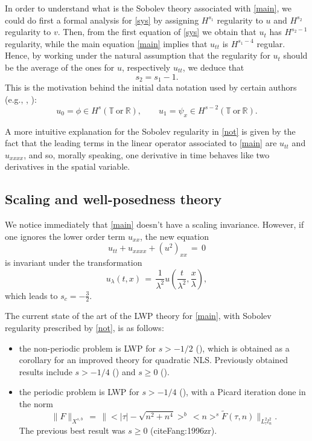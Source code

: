 \documentclass{amsart}
\begin{document}
In order to understand what is the Sobolev theory associated with \eqref{main}, we could do first a formal analysis for \eqref{sys} by assigning $H^{s_1}$ regularity to $u$ and $H^{s_2}$ regularity to $v$. Then, from the first equation of \eqref{sys} we obtain that $u_t$ has $H^{s_2-1}$ regularity, while the main equation \eqref{main} implies that $u_{tt}$ is $H^{s_1-4}$ regular. Hence, by working under the natural assumption that the regularity for $u_t$ should be the average of the ones for $u$, respectively $u_{tt}$, we deduce that
\[
s_2=s_1-1.
\] 
This is the motivation behind the initial data notation used by certain authors (e.g., \cite{Farah:2009uq}, \cite{Farah:2010ys}):
\begin{equation}
u_0=\phi\in H^s(\mathbb{T}\ \text{or} \ \mathbb{R}), \qquad u_1=\psi_x \in H^{s-2}(\mathbb{T}\ \text{or} \ \mathbb{R}).
\label{not}
\end{equation}

A more intuitive explanation for the Sobolev regularity in \eqref{not} is given by the fact that the leading terms in the linear operator associated to \eqref{main} are $u_{tt}$ and $u_{xxxx}$, and so, morally speaking, one derivative in time behaves like two derivatives in the spatial variable. 

\subsection{Scaling and well-posedness theory} We notice immediately that \eqref{main} doesn't have a scaling invariance. However, if one ignores the lower order term $u_{xx}$, the new equation 
\begin{equation}
u_{tt}+u_{xxxx}+(u^2)_{xx}\,=\,0\label{new}
\end{equation}
is invariant under the transformation
\[
u_{\lambda}(t,x)\,=\,\frac{1}{\lambda^2}u\left(\frac{t}{\lambda^2}, \frac{x}{\lambda}\right),
\]
which leads to $s_c=-\frac 32$.

The current state of the art of the LWP theory for \eqref{main}, with Sobolev regularity prescribed by \eqref{not}, is as follows:
\begin{itemize}
\item the non-periodic problem is LWP for $s>-1/2$ (\cite{Kishimoto:2010ly}), which is obtained as a corollary for an improved theory for quadratic NLS\@. Previously obtained results include $s>-1/4$ (\cite{Farah:2009uq}) and $s\geq 0$ (\cite{Linares:1993ly}).

\item the periodic problem is LWP for $s>-1/4$ (\cite{Farah:2010ys}), with a Picard iteration done in
the norm
\[
\|F\|_{X^{s,b}}\,=\,\|<|\tau|-\sqrt{n^2+n^4}>^b\,<n>^s \tilde{F}(\tau,n)\|_{L^2_{\tau}l^2_n}.
\]
The previous best result was $s\geq 0$ (cite{Fang:1996zr}).
\end{itemize}
\end{document}
